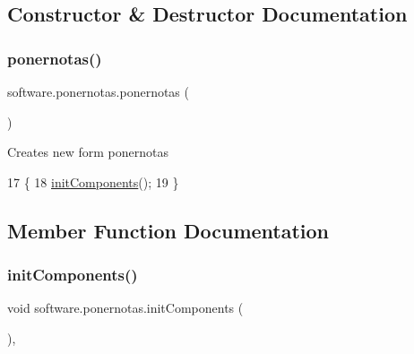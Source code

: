 \subsection{Constructor \& Destructor Documentation}
\mbox{\label{classsoftware_1_1ponernotas_a414e3fc6867bed1d7b001e2299c18bbf}} 
\subsubsection{\texorpdfstring{ponernotas()}{ponernotas()}}
{\footnotesize\ttfamily software.\+ponernotas.\+ponernotas (\begin{DoxyParamCaption}{ }\end{DoxyParamCaption})\hspace{0.3cm}{\ttfamily [inline]}}

Creates new form ponernotas 
\begin{DoxyCode}
17                         \{
18         \mbox{\hyperlink{classsoftware_1_1ponernotas_ad1e0b287e6033a145feeefd7fc05847b}{initComponents}}();
19     \}
\end{DoxyCode}


\subsection{Member Function Documentation}
\mbox{\label{classsoftware_1_1ponernotas_ad1e0b287e6033a145feeefd7fc05847b}} 
\subsubsection{\texorpdfstring{init\+Components()}{initComponents()}}
{\footnotesize\ttfamily void software.\+ponernotas.\+init\+Components (\begin{DoxyParamCaption}{ }\end{DoxyParamCaption})\hspace{0.3cm}{\ttfamily [inline]}, {\ttfamily [private]}}


